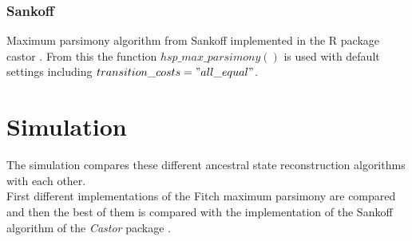 
    \subsubsection{Sankoff}
      Maximum parsimony algorithm from Sankoff implemented in the R package castor \cite{Louca2017}.
        From this the function \textit{$hsp\_max\_parsimony()$} is used with default settings including
        $transition\_costs="all\_equal"$. \\

  \section{Simulation}\label{sec:methods - simulation}
    The simulation compares these different ancestral state reconstruction algorithms with each 
      other. \\
    First different implementations of the Fitch maximum parsimony are compared and then the best of 
      them is compared with the implementation of the Sankoff algorithm of the \textit{Castor} package 
      \cite{Louca2017}.

